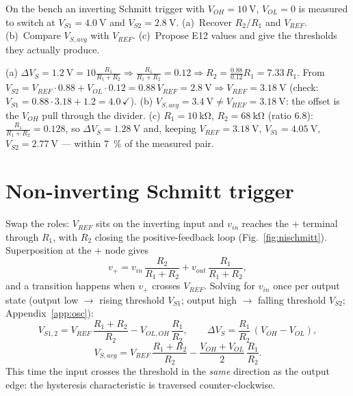 \documentclass[11pt,a4paper,oneside]{book}
\begin{document}
\begin{exercise}
On the bench an inverting Schmitt trigger with $V_{OH}=\qty{10}{\volt}$,
$V_{OL}=0$ is measured to switch at $V_{S1}=\qty{4.0}{\volt}$ and
$V_{S2}=\qty{2.8}{\volt}$. (a)~Recover $R_2/R_1$ and $V_{REF}$.
(b)~Compare $V_{S,avg}$ with $V_{REF}$. (c)~Propose E12 values and give the
thresholds they actually produce.
\end{exercise}
\begin{solution}
(a) $\Delta V_S=\qty{1.2}{\volt}=10\frac{R_1}{R_1+R_2}\Rightarrow
\frac{R_1}{R_1+R_2}=0.12\Rightarrow R_2=\frac{0.88}{0.12}R_1=7.33\,R_1$.
From $V_{S2}=V_{REF}\cdot0.88+V_{OL}\cdot0.12=0.88\,V_{REF}=\qty{2.8}{\volt}
\Rightarrow V_{REF}=\qty{3.18}{\volt}$ (check: $V_{S1}=0.88\cdot3.18+1.2=4.0\,\checkmark$).
(b) $V_{S,avg}=\qty{3.4}{\volt}\neq V_{REF}=\qty{3.18}{\volt}$: the offset is
the $V_{OH}$ pull through the divider. (c) $R_1=\qty{10}{\kilo\ohm}$,
$R_2=\qty{68}{\kilo\ohm}$ (ratio 6.8): $\frac{R_1}{R_1+R_2}=0.128$, so
$\Delta V_S=\qty{1.28}{\volt}$ and, keeping $V_{REF}=\qty{3.18}{\volt}$,
$V_{S1}=\qty{4.05}{\volt}$, $V_{S2}=\qty{2.77}{\volt}$ --- within
\qty{7}{\percent} of the measured pair.
\end{solution}

\section{Non-inverting Schmitt trigger}\label{sec:nischmitt}
Swap the roles: $V_{REF}$ sits on the inverting input and $v_{in}$ reaches the
$+$ terminal through $R_1$, with $R_2$ closing the positive-feedback loop
(Fig.~\ref{fig:nischmitt}). Superposition at the $+$ node gives
\[
  v_+=v_{in}\,\frac{R_2}{R_1+R_2}+v_{out}\,\frac{R_1}{R_1+R_2},
\]
and a transition happens when $v_+$ crosses $V_{REF}$. Solving for $v_{in}$
once per output state (output low $\to$ rising threshold $V_{S1}$; output high
$\to$ falling threshold $V_{S2}$; Appendix~\ref{app:osc}):
\[
  V_{S1,2}=V_{REF}\,\frac{R_1+R_2}{R_2}-V_{OL,OH}\,\frac{R_1}{R_2},\qquad
  \Delta V_S=\frac{R_1}{R_2}\,(V_{OH}-V_{OL}),
\]
\[
  V_{S,avg}=V_{REF}\,\frac{R_1+R_2}{R_2}-\frac{V_{OH}+V_{OL}}{2}\,\frac{R_1}{R_2}.
\]
This time the input crosses the threshold in the \emph{same} direction as the
output edge: the hysteresis characteristic is traversed counter-clockwise.
\end{document}
